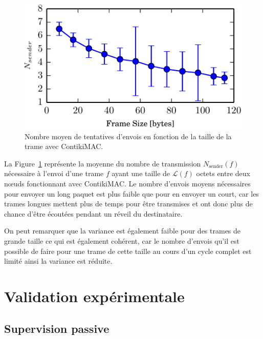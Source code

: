 \begin{figure}[h]
  \centering
  \includegraphics[width=.5\textwidth]{img/average_strobbing-crop.pdf}
  \caption{Nombre moyen de tentatives d'envois en fonction de la taille de la trame avec ContikiMAC.}
  \label{supervision:fig:average_strobing}
\end{figure}

La Figure~\ref{supervision:fig:average_strobing} représente la moyenne du nombre de transmission  $N_{\textrm{sender}}(f)$ nécessaire à l'envoi d'une trame $f$ ayant une taille de $\mathcal{L}(f)$ octets entre deux nœuds fonctionnant avec ContikiMAC.
Le nombre d'envois moyens nécessaires pour envoyer un long paquet est plus faible que pour en envoyer un court, car les trames longues mettent plus de temps pour être transmises et ont donc plus de chance d'être écoutées pendant un réveil du destinataire.

On peut remarquer que la variance est également faible pour des trames de grande taille ce qui est également cohérent, car le nombre d'envois qu'il est possible de faire pour une trame de cette taille au cours d'un cycle complet est limité ainsi la variance est réduite. 

\section{Validation expérimentale}
\label{supervision:validation}

\subsection{Supervision passive}
\label{supervision:chain_results}

